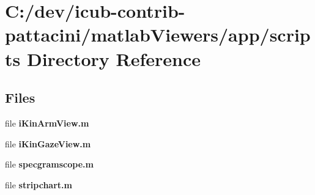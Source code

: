 \section{C\+:/dev/icub-\/contrib-\/pattacini/matlab\+Viewers/app/scripts Directory Reference}
\label{dir_726744940e22a7b0b0ba8b427aad03a6}
\subsection*{Files}
\begin{DoxyCompactItemize}
\item 
file {\bfseries i\+Kin\+Arm\+View.\+m}
\item 
file {\bfseries i\+Kin\+Gaze\+View.\+m}
\item 
file {\bfseries specgramscope.\+m}
\item 
file {\bfseries stripchart.\+m}
\end{DoxyCompactItemize}
